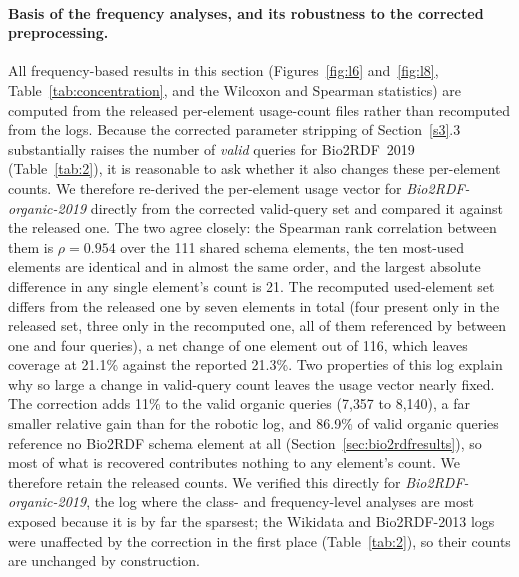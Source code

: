 \documentclass[sw]{iosart2x}
\begin{document}
\paragraph{\textbf{Basis of the frequency analyses, and its robustness to the corrected preprocessing.}}
All frequency-based results in this section (Figures~\ref{fig:l6} and~\ref{fig:l8}, Table~\ref{tab:concentration},
and the Wilcoxon and Spearman statistics) are computed from the released per-element usage-count files rather
than recomputed from the logs. Because the corrected parameter stripping of Section~\ref{s3}.3 substantially
raises the number of \emph{valid} queries for Bio2RDF~2019 (Table~\ref{tab:2}), it is reasonable to ask whether
it also changes these per-element counts. We therefore re-derived the per-element usage vector for
\emph{Bio2RDF-organic-2019} directly from the corrected valid-query set and compared it against the released
one. The two agree closely: the Spearman rank correlation between them is $\rho = 0.954$ over the 111 shared
schema elements, the ten most-used elements are identical and in almost the same order, and the largest
absolute difference in any single element's count is 21. The recomputed used-element set differs from the released
one by seven elements in total (four present only in the released set, three only in the recomputed one, all of
them referenced by between one and four queries), a net change of one element out of 116, which leaves coverage
at 21.1\% against the reported 21.3\%. Two properties of this log explain why so large a change in valid-query
count leaves the usage vector nearly fixed. The correction adds 11\% to the valid organic queries (7{,}357 to
8{,}140), a far smaller relative gain than for the robotic log, and 86.9\% of valid organic queries reference no
Bio2RDF schema element at all (Section~\ref{sec:bio2rdfresults}), so most of what is recovered contributes
nothing to any element's count. We therefore retain the released counts. We verified this directly for
\emph{Bio2RDF-organic-2019}, the log where the class- and frequency-level analyses are most exposed because it
is by far the sparsest; the Wikidata and Bio2RDF-2013 logs were unaffected by the correction in the first place
(Table~\ref{tab:2}), so their counts are unchanged by construction.
\end{document}
